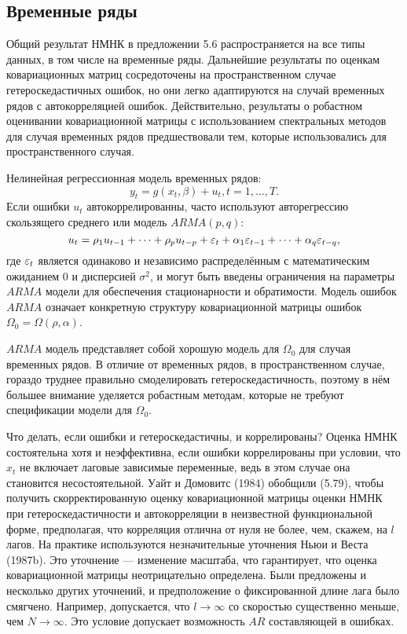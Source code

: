 \subsection{Временные ряды}

Общий результат НМНК в предложении 5.6 распространяется на все типы данных, в том числе на  временные ряды. Дальнейшие результаты по оценкам ковариационных матриц сосредоточены на пространственном случае гетероскедастичных ошибок, но они легко адаптируются на случай временных рядов с автокорреляцией ошибок. Действительно, результаты о робастном оценивании ковариационной матрицы с использованием спектральных  методов для случая временных рядов предшествовали тем, которые использовались для пространственного случая.

Нелинейная регрессионная модель временных рядов:
\[
y_t=g(x_t,\beta)+u_t, t=1, \dots, T.
\]
Если ошибки $u_t$ автокоррелированны, часто используют авторегрессию скользящего среднего или модель $ARMA(p,q)$:
\[
u_t=\rho_{1} u_{t-1}+\cdots+\rho_{p} u_{t-p} + \varepsilon_t + \alpha_{1} \varepsilon_{t-1}+\cdots+\alpha_{q} \varepsilon_{t-q},
\]
где $\varepsilon_t$ является одинаково и независимо распределённым с математическим ожиданием 0 и дисперсией $\sigma^2$, и могут быть введены ограничения на параметры $ARMA$ модели для обеспечения стационарности и обратимости. Модель ошибок $ARMA$ означает конкретную структуру ковариационной матрицы ошибок $\Omega_0=\Omega(\rho,\alpha)$.

$ARMA$ модель представляет собой хорошую модель для $\Omega_0$ для случая временных рядов. В отличие от временных рядов, в пространственном случае, гораздо труднее правильно смоделировать гетероскедастичность, поэтому в нём большее внимание уделяется робастным методам, которые не требуют спецификации модели для $\Omega_0$.

Что делать, если ошибки и гетероскедастичны, и коррелированы? Оценка НМНК состоятельна  хотя и неэффективна, если ошибки коррелированы при условии, что $x_t$ не включает лаговые зависимые переменные, ведь в этом случае она становится несостоятельной. Уайт и Домовитс (1984) обобщили (5.79), чтобы получить скорректированную оценку ковариационной матрицы оценки НМНК при гетероскедастичности и автокорреляции в неизвестной функциональной форме, предполагая, что корреляция отлична от нуля не более, чем, скажем, на $l$ лагов. На практике используются незначительные уточнения Ньюи и Веста (1987b). Это уточнение --- изменение масштаба, что гарантирует, что оценка ковариационной матрицы неотрицательно определена. Были предложены и несколько других уточнений, и предположение о фиксированной длине лага было смягчено. Например, допускается, что  $l \rightarrow \infty$ со скоростью существенно меньше, чем $N \rightarrow \infty$. Это условие допускает возможность $AR$ составляющей в ошибках.

